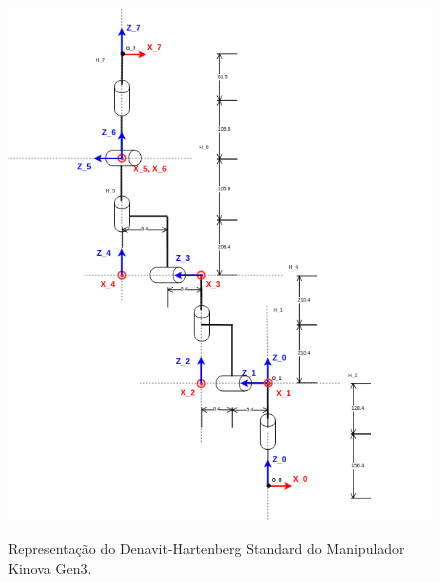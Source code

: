 \documentclass[a4paper,11pt]{article}
\theoremstyle{mytheor}
\begin{document}
\begin{figure}[!ht]
\centering
\caption{Representação do Denavit-Hartenberg Standard do Manipulador Kinova Gen3.}
\includegraphics[scale=1]{figs/ex2_dh}
\label{fig:kgen3_representacao_dh}
\end{figure}
\end{document}
